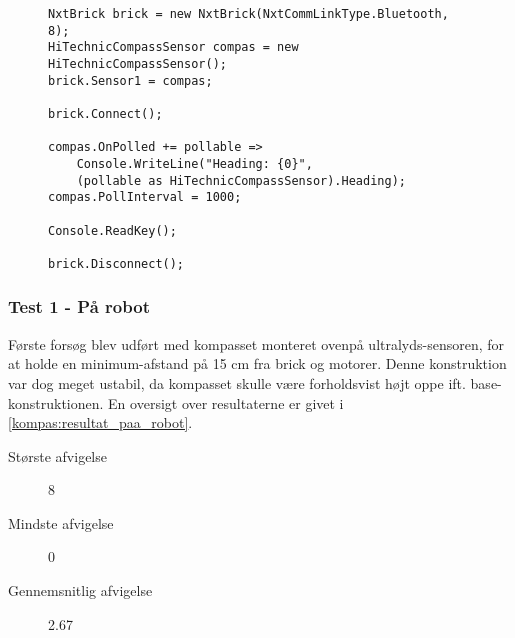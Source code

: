 \begin{figure}[h]
\begin{lstlisting}[style=csharpsmall,caption={Kode brugt til test},label=kompas:kode_test,frame=single]
NxtBrick brick = new NxtBrick(NxtCommLinkType.Bluetooth, 8);
HiTechnicCompassSensor compas = new HiTechnicCompassSensor();
brick.Sensor1 = compas;

brick.Connect();

compas.OnPolled += pollable =>
	Console.WriteLine("Heading: {0}",
	(pollable as HiTechnicCompassSensor).Heading);
compas.PollInterval = 1000;

Console.ReadKey();

brick.Disconnect();
\end{lstlisting}
\end{figure}

\subsubsection{Test 1 - På robot}
Første forsøg blev udført med kompasset monteret ovenpå ultralyds-sensoren, for at holde en minimum-afstand på 15 cm fra brick og motorer.
Denne konstruktion var dog meget ustabil, da kompasset skulle være forholdsvist højt oppe ift. base-konstruktionen.
En oversigt over resultaterne er givet i \cref{kompas:resultat_paa_robot}.

\begin{description}
\item[Største afvigelse]{8\dg}
\item[Mindste afvigelse]{0\dg}
\item[Gennemsnitlig afvigelse]{2.67}
\end{description}

